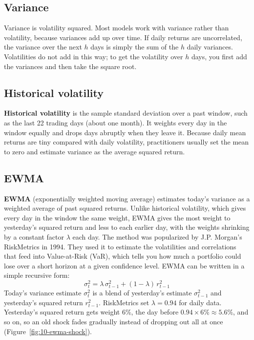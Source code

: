 \subsection{Variance}

Variance is volatility squared. 
Most models work with variance rather than volatility, because variances add up over time. If daily returns are uncorrelated, the variance over the next $h$ days is simply the sum of the $h$ daily variances. Volatilities do not add in this way; to get the volatility over $h$ days, you first add the variances and then take the square root.


\subsection{Historical volatility}

\textbf{Historical volatility} is the sample standard deviation over a past window, such as the last 22 trading days (about one month). It weights every day in the window equally and drops days abruptly when they leave it. Because daily mean returns are tiny compared with daily volatility, practitioners usually set the mean to zero and estimate variance as the average squared return.

\subsection{EWMA}


\textbf{EWMA} (exponentially weighted moving average) estimates today's variance as a weighted average of past squared returns. Unlike historical volatility, which gives every day in the window the same weight, EWMA gives the most weight to yesterday's squared return and less to each earlier day, with the weights shrinking by a constant factor $\lambda$ each day. The method was popularized by J.P. Morgan's RiskMetrics in 1994.
They used it to estimate the volatilities and correlations that feed into Value-at-Risk (VaR), which tells you how much a portfolio could lose over a short horizon at a given confidence level.
EWMA can be written in a simple recursive form:
\begin{equation}
  \sigma^2_t = \lambda\,\sigma^2_{t-1} + (1 - \lambda)\,r^2_{t-1}
  \label{eq:10-ewma}
\end{equation}
Today's variance estimate $\sigma^2_t$ is a blend of yesterday's estimate $\sigma^2_{t-1}$ and yesterday's squared return $r^2_{t-1}$.
RiskMetrics set $\lambda = 0.94$ for daily data. Yesterday's squared return gets weight 6\%, the day before $0.94 \times 6\% \approx 5.6\%$, and so on, so an old shock fades gradually instead of dropping out all at once (Figure~\ref{fig:10-ewma-shock}).



